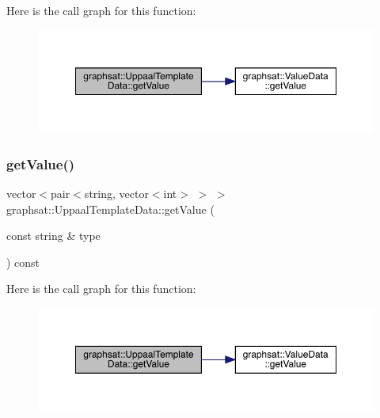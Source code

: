 Here is the call graph for this function\+:
\nopagebreak
\begin{figure}[H]
\begin{center}
\leavevmode
\includegraphics[width=350pt]{classgraphsat_1_1_uppaal_template_data_a984e6f2c3acbfa11b3ab974f64a62b94_cgraph}
\end{center}
\end{figure}
\mbox{\label{classgraphsat_1_1_uppaal_template_data_a6721645921deae3e0d24fbf36b8a7827}} 
\subsubsection{\texorpdfstring{getValue()}{getValue()}\hspace{0.1cm}{\footnotesize\ttfamily [3/3]}}
{\footnotesize\ttfamily vector$<$pair$<$string, vector$<$int$>$ $>$ $>$ graphsat\+::\+Uppaal\+Template\+Data\+::get\+Value (\begin{DoxyParamCaption}\item[{const string \&}]{type }\end{DoxyParamCaption}) const\hspace{0.3cm}{\ttfamily [inline]}}

Here is the call graph for this function\+:
\nopagebreak
\begin{figure}[H]
\begin{center}
\leavevmode
\includegraphics[width=350pt]{classgraphsat_1_1_uppaal_template_data_a6721645921deae3e0d24fbf36b8a7827_cgraph}
\end{center}
\end{figure}
\mbox{\label{classgraphsat_1_1_uppaal_template_data_a655ac9ea161d412b0a3301d834da15b1}} 

